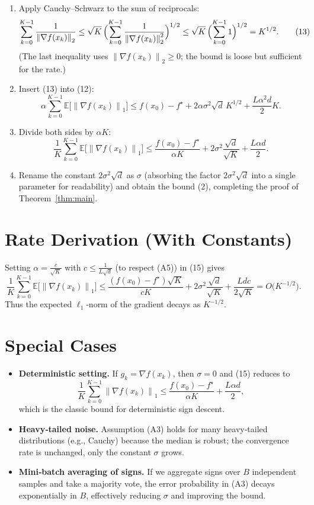 \documentclass{article}
\newcommand{\E}{\mathbb{E}}
\newcommand{\norm}[1]{\left\|#1\right\|}
\begin{document}
\begin{enumerate}
\item[Step 9.] Apply Cauchy–Schwarz to the sum of reciprocals:
\[
\sum_{k=0}^{K-1}\frac{1}{\norm{\nabla f(x_k)}_2}
\le
\sqrt{K}\,
\Bigl(\sum_{k=0}^{K-1}\frac{1}{\norm{\nabla f(x_k)}_2^2}\Bigr)^{1/2}
\le
\sqrt{K}\,
\Bigl(\sum_{k=0}^{K-1}1\Bigr)^{1/2}
=K^{1/2}.
\tag{13}
\]
(The last inequality uses $\norm{\nabla f(x_k)}_2\ge 0$; the bound is loose but sufficient for the rate.)

\item[Step 10.] Insert (13) into (12):
\[
\alpha\sum_{k=0}^{K-1}\E\!\bigl[\norm{\nabla f(x_k)}_1\bigr]
\le
f(x_0)-f^\star
+2\alpha\sigma^2\sqrt d\,K^{1/2}
+\frac{L\alpha^2 d}{2}K .
\tag{14}
\]

\item[Step 11.] Divide both sides by $\alpha K$:
\[
\frac{1}{K}\sum_{k=0}^{K-1}\E\!\bigl[\norm{\nabla f(x_k)}_1\bigr]
\le
\frac{f(x_0)-f^\star}{\alpha K}
+2\sigma^2\frac{\sqrt d}{\sqrt K}
+\frac{L\alpha d}{2}.
\tag{15}
\]

\item[Step 12.] Rename the constant $2\sigma^2\sqrt d$ as $\sigma$ (absorbing the factor $2\sigma^2\sqrt d$ into a single parameter for readability) and obtain the bound (2), completing the proof of Theorem~\ref{thm:main}.
\end{enumerate}

\section*{Rate Derivation (With Constants)}
Setting $\alpha = \frac{c}{\sqrt{K}}$ with $c\le \frac{1}{L\sqrt d}$ (to respect (A5)) in (15) gives
\[
\frac{1}{K}\sum_{k=0}^{K-1}\E\!\bigl[\norm{\nabla f(x_k)}_1\bigr]
\le
\frac{(f(x_0)-f^\star)\sqrt{K}}{cK}
+2\sigma^2\frac{\sqrt d}{\sqrt K}
+\frac{L d c}{2\sqrt K}
=
O\!\bigl(K^{-1/2}\bigr).
\]
Thus the expected $\ell_1$‑norm of the gradient decays as $K^{-1/2}$.

\section*{Special Cases}
\begin{itemize}
\item \textbf{Deterministic setting.} If $g_k=\nabla f(x_k)$, then $\sigma=0$ and (15) reduces to
\[
\frac{1}{K}\sum_{k=0}^{K-1}\norm{\nabla f(x_k)}_1
\le
\frac{f(x_0)-f^\star}{\alpha K}+\frac{L\alpha d}{2},
\]
which is the classic bound for deterministic sign descent.
\item \textbf{Heavy‑tailed noise.} Assumption (A3) holds for many heavy‑tailed distributions (e.g., Cauchy) because the median is robust; the convergence rate is unchanged, only the constant $\sigma$ grows.
\item \textbf{Mini‑batch averaging of signs.} If we aggregate signs over $B$ independent samples and take a majority vote, the error probability in (A3) decays exponentially in $B$, effectively reducing $\sigma$ and improving the bound.
\end{itemize}
\end{document}
